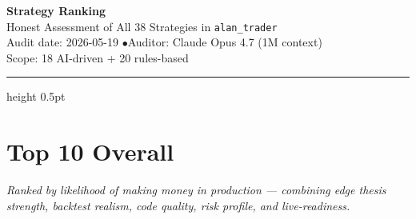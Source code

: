 \documentclass[11pt,a4paper]{article}
\begin{document}
\begin{center}
{\huge\bfseries\color{accent}Strategy Ranking}\\[4pt]
{\large Honest Assessment of All 38 Strategies in \texttt{alan\_trader}}\\[10pt]
{\small\color{gray}Audit date: 2026-05-19 \quad$\bullet$\quad Auditor: Claude Opus 4.7 (1M context)}\\
{\small\color{gray}Scope: 18 AI-driven + 20 rules-based}
\end{center}

\vspace{8pt}
\hrule height 0.5pt
\vspace{14pt}

\section*{Top 10 Overall}

\textit{Ranked by likelihood of making money in production --- combining edge thesis strength, backtest realism, code quality, risk profile, and live-readiness.}
\end{document}
